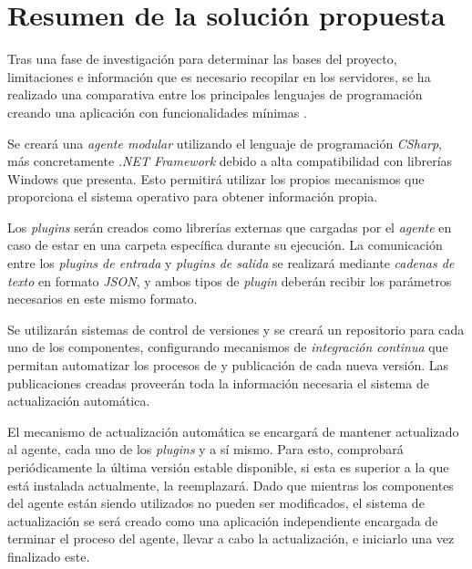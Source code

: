 \section{Resumen de la solución propuesta} \label{sec:sol}

    Tras una fase de investigación para determinar las bases del proyecto, limitaciones e información que es necesario recopilar en los servidores, se ha realizado una comparativa entre los principales lenguajes de programación creando una aplicación con funcionalidades mínimas . 
    
    Se creará una \textit{agente modular} utilizando el lenguaje de programación \textit{CSharp}, más concretamente \textit{.NET Framework} debido a alta compatibilidad con librerías Windows que presenta. Esto permitirá utilizar los propios mecanismos que proporciona el sistema operativo para obtener información propia.
    
    Los \textit{plugins} serán creados como librerías externas que  cargadas por el \textit{agente} en caso de estar en una carpeta específica durante su ejecución. La comunicación entre los \textit{plugins de entrada} y \textit{plugins de salida} se realizará mediante \textit{cadenas de texto} en formato \textit{JSON}, y ambos tipos de \textit{plugin} deberán recibir los parámetros necesarios en este mismo formato.
    
    Se utilizarán sistemas de control de versiones y se creará un repositorio para cada uno de los componentes, configurando mecanismos de \textit{integración continua} que permitan automatizar los procesos de  y publicación de cada nueva versión. Las publicaciones creadas proveerán toda la información necesaria  el sistema de actualización automática.
    
    El mecanismo de actualización automática se encargará de mantener actualizado al agente, cada uno de los \textit{plugins} y a sí mismo. Para esto, comprobará periódicamente la última versión estable disponible, si esta es superior a la que está instalada actualmente, la reemplazará. Dado que mientras los componentes del agente están siendo utilizados no pueden ser modificados, el sistema de actualización se será creado como una aplicación independiente encargada de terminar el proceso del agente, llevar a cabo la actualización, e iniciarlo una vez finalizado este.
    
